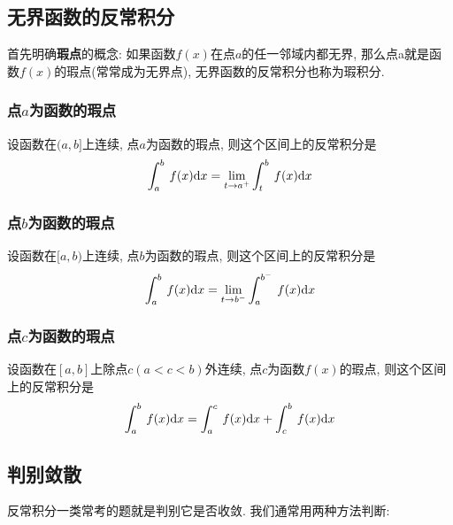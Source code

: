 \subsection{无界函数的反常积分}
首先明确\textbf{瑕点}的概念: 如果函数$ f(x) $在点$ a $的任一邻域内都无界, 那么点a就是函数$ f(x) $的瑕点(常常成为无界点), 无界函数的反常积分也称为瑕积分.
\subsubsection{点$ a $为函数的瑕点}
设函数在$ (a,b] $上连续, 点$ a $为函数的瑕点, 则这个区间上的反常积分是
\begin{equation*}
\displaystyle\int_{a}^{b}\hspace{.2em}f(x)\mathrm{d}x=\lim\limits_{t \rightarrow a^{+}}\displaystyle\int_{t}^{b}\hspace{.2em}f(x)\mathrm{d}x
\end{equation*}
\subsubsection{点$ b $为函数的瑕点}
设函数在$ [a,b) $上连续, 点$ b $为函数的瑕点, 则这个区间上的反常积分是
\begin{equation*}
\displaystyle\int_{a}^{b}\hspace{.2em}f(x)\mathrm{d}x=\lim\limits_{t \rightarrow b^{-}}\displaystyle\int_{a}^{b^{-}}\hspace{.2em}f(x)\mathrm{d}x
\end{equation*}
\subsubsection{点$ c $为函数的瑕点}
设函数在$ [a,b] $上除点$ c(a<c<b) $外连续, 点$ c $为函数$ f(x) $的瑕点, 则这个区间上的反常积分是
\begin{equation*}
\displaystyle\int_{a}^{b}\hspace{.2em}f(x)\mathrm{d}x=\displaystyle\int_{a}^{c}\hspace{.2em}f(x)\mathrm{d}x+\displaystyle\int_{c}^{b}\hspace{.2em}f(x)\mathrm{d}x
\end{equation*}
\subsection{判别敛散}
反常积分一类常考的题就是判别它是否收敛. 我们通常用两种方法判断:
